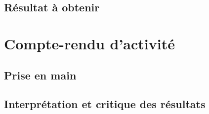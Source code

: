 \section{Résultat à obtenir}


\chapter{Compte-rendu d'activité}
\paragraph{}

\section{Prise en main}
\section{Interprétation et critique des résultats}
\subparagraph{}
